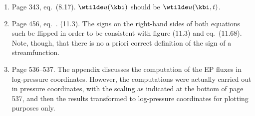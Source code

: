 \documentclass[10pt]{article}
\newcommand{\eq}{eq.\ } \newcommand{\Eq}{Eq.\ }
\begin{document}
\begin{enumerate}
\item Page 343, \eq (8.17). $\wtilde u(\kbi)$ should be $\wtilde u(\kbi,t)$. {}

\item Page 456, \eq. (11.3). The signs on the right-hand sides of both equations such be flipped in order to be consistent with figure (11.3) and \eq (11.68). Note, though, that there is no a priori correct definition of the sign of a streamfunction. 


\item Page 536--537. The appendix discusses the computation of the EP fluxes in log-pressure coordinates. However, the computations were actually carried out in pressure coordinates, with the scaling as indicated at the bottom of page 537, and then the results transformed to log-pressure coordinates for plotting purposes only. 

\end{enumerate}
\end{document}

